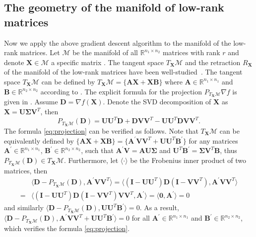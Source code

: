 \documentclass[12pt]{article}
\newcommand{\grad}{\nabla}
\newcommand{\bX}{\boldsymbol{X}}
\newcommand{\bD}{\boldsymbol{D}}
\newcommand{\bSigma}{\boldsymbol\Sigma}
\newcommand{\bU}{\boldsymbol{U}}
\newcommand{\bV}{\boldsymbol{V}}
\def\reals{\mathbb{R}}
\def\bSigma{\boldsymbol\Sigma}
\def\bU{\boldsymbol{U}}
\def\bA{\boldsymbol{A}}
\def\bAp{\boldsymbol{A}^{\prime}}
\def\bB{\boldsymbol{B}}
\def\bBp{\boldsymbol{B}^{\prime}}
\def\bI{\mathbf{I}}
\def\calM{\mathcal{M}}
\theoremstyle{plain}
\theoremstyle{definition}
\theoremstyle{plain}
\theoremstyle{plain}
\theoremstyle{remark}
\begin{document}
\subsection{The geometry of the manifold of low-rank matrices}\label{sec:geometry}
Now we apply the above gradient descent algorithm to the manifold of the low-rank matrices. Let $\calM$ be the manifold of all $\reals^{n_1\times n_2}$ matrices with rank $r$ and denote $\bX\in\calM$ a specific matrix . The tangent space $T_{\bX}\calM$ and the retraction $R_{\bX}$ of the manifold of the low-rank matrices have been well-studied~\cite{Absil2015}. The tangent space $T_{\bX}\calM$ can be defined by $T_{\bX}\calM=\{\bA\bX+\bX\bB\}$ where $\bA\in\reals^{n_1\times n_1}$ and  $\bB\in\reals^{n_2\times n_2}$ according to \cite{Absil2015}. The explicit formula for the projection $P_{T_{\bX}\calM}\grad f$ is given in \cite[(9)]{Absil2015}. Assume $\bD=\grad f(\bX)$. Denote the SVD decomposition of $\bX$ as $\bX=\bU\bSigma\bV^{T}$, then 
\begin{equation}\label{eq:projection}
P_{T_{\bX}\calM}(\bD)=\bU\bU^{T}\bD+ \bD\bV\bV^{T}-\bU\bU^{T}\bD\bV\bV^{T}.
\end{equation}
The formula \eqref{eq:projection} can be verified as follows. Note that $T_{\bX}\calM$ can be equivalently defined by $\{\bA\bX+\bX\bB\}=\{\bAp\bV\bV^{T}+\bU\bU^{T}\bBp\}$ for any matrices $\bAp\in\reals^{n_1\times n_1}$,  $\bBp\in\reals^{n_2\times n_2}$, such that $\bAp\bV=\bA\bU\bSigma$ and $\bU^{T}\bBp=\bSigma\bV^{T}\bB$, thus $P_{T_{\bX}\calM}(\bD)\in T_{\bX}\calM$. Furthermore, let $\langle\cdot\rangle$ be the Frobenius inner product of two matrices, then 
\begin{align*}
&\langle \bD-P_{T_{\bX}\calM}(\bD),  \bAp\bV\bV^{T}\rangle=\langle (\bI-\bU\bU^{T})\bD(\bI-\bV\bV^{T}),  \bAp\bV\bV^{T}\rangle\\=&\langle (\bI-\bU\bU^{T})\bD(\bI-\bV\bV^{T})\bV\bV^{T},  \bAp\rangle=\langle \mathbf{0},\bAp\rangle=0
\end{align*}
and similarly $\langle \bD-P_{T_{\bX}\calM}(\bD),  \bU\bU^{T}\bBp\rangle=0$. As a result, $\langle \bD-P_{T_{\bX}\calM}(\bD),   \bAp\bV\bV^{T}+\bU\bU^{T}\bBp\rangle=0$ for all $\bAp\in\reals^{n_1\times n_1}$ and  $\bBp\in\reals^{n_2\times n_2}$, which verifies the formula \eqref{eq:projection}.
\end{document}
